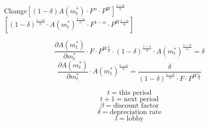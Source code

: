 \documentclass[12pt]{article}
\begin{document}
\begin{flushleft}
Change$\left[(1-\delta)A(m^\ast_t)\cdot F^\alpha \cdot P^W\right]^\frac{1-\alpha}{\alpha}$\ \ $\left[(1-\delta)^\frac{1-\alpha}{\alpha}\cdot A(m^\ast_t)^\frac{1-\alpha}{\alpha}\cdot F^{1-\alpha}\cdot P^{W\frac{1-\alpha}{\alpha}}\right]$
\end{flushleft}
\[
\frac{\partial A(m^\ast_t)}{\partial m^\ast_t} \cdot F \cdot P^{W\frac{1}{\alpha}}\cdot(1-\delta)^\frac{1-\alpha}{\alpha}\cdot A(m^\ast_t)^\frac{1-\alpha}{\alpha}=\delta
\]
\[
  \frac{\partial A(m^\ast_t)}{\partial m^\ast_t} \cdot A(m^\ast_t)^\frac{1-\alpha}{\alpha}=\frac{\delta}{(1-\delta)^{\frac{1-\alpha}{\alpha}}\cdot F\cdot P^{W\frac{1}{\alpha}}}
\]

\[
t=\text{this period}
\]
\[
t+1=\text{next period}
\]
\[
\beta=\text{discount factor}
\]
\[
\delta=\text{depreciation rate}
\]
\[
l=\text{lobby}
\]
\end{document}
